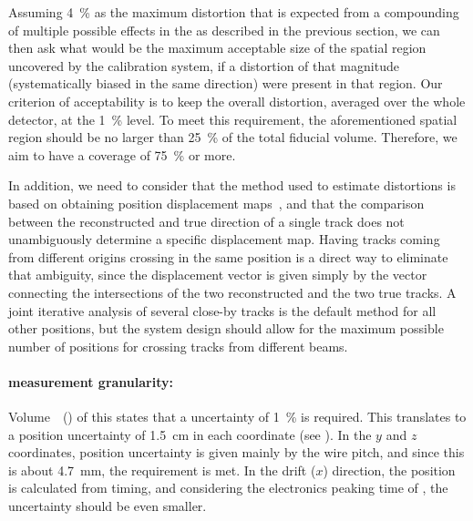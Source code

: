 Assuming \SI{4}{\%} as the maximum \efield distortion %
that is %
expected from a compounding of multiple possible effects in the   %
as described in the previous section,
we can then ask what would be the maximum acceptable size of the spatial region uncovered by the calibration system, if a distortion of that magnitude (systematically biased in the same direction) were present in that region. Our criterion of acceptability is to keep the overall \efield distortion, averaged over the whole detector, at the \SI{1}{\%} level. 
To meet this requirement, the aforementioned spatial region should be no larger than \SI{25}{\%} of the total fiducial volume. Therefore, we aim to have a coverage of \SI{75}{\%} or more.

In addition, we need to consider that the method used to estimate \efield distortions is based on obtaining position displacement maps~\cite{bib:uBlaser2019}, and that the comparison between the reconstructed and true direction of a single track does not %
unambiguously determine a specific displacement map. Having tracks coming from different origins crossing in the same position is a direct way to eliminate that ambiguity, since the displacement vector is given simply by the vector connecting the intersections of the two reconstructed and the two true tracks. A joint iterative analysis of several close-by tracks is the default method for all other positions, but the system design should allow for the maximum possible number of positions %
for crossing tracks from different beams.

\paragraph{\efield measurement granularity:}

Volume~\volnumberphysics~(\voltitlephysics) of this  states that a  uncertainty of \SI{1}{\%} is required. 
This translates to a position uncertainty of \SI{1.5}{\cm} in each coordinate (see  \spchapa). 
In the $y$ and $z$ coordinates, position uncertainty is given mainly by the  wire pitch, and since this is about \SI{4.7}{\mm}, the requirement is met. In the drift ($x$) direction, the position is calculated from timing, and considering the electronics peaking time of \fepeaktime, the uncertainty should be even smaller.

